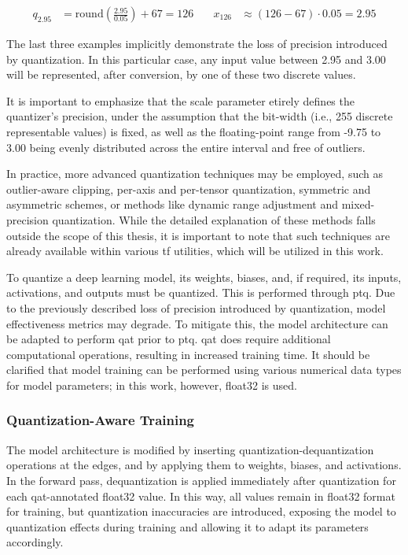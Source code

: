 {\begin{align*}
q_{2.95} &= \text{round}\left(\frac{2.95}{0.05} \right) + 67 = 126
& \quad
x_{126} &\approx \left( 126 - 67 \right) \cdot 0.05 = 2.95
\end{align*}

The last three examples implicitly demonstrate the loss of precision introduced by quantization.
In this particular case, any input value between 2.95 and 3.00 will be represented, after conversion, by one of these two discrete values.

It is important to emphasize that the scale parameter etirely defines the quantizer's precision,
under the assumption that the bit-width (i.e., 255 discrete representable values) is fixed,
as well as the floating-point range from -9.75 to 3.00 being evenly distributed across the entire interval and free of outliers.

In practice, more advanced quantization techniques may be employed, such as outlier-aware clipping, per-axis and per-tensor quantization,
symmetric and asymmetric schemes, or methods like dynamic range adjustment and mixed-precision quantization.
While the detailed explanation of these methods falls outside the scope of this thesis,
it is important to note that such techniques are already available within various \gls{tf} utilities, which will be utilized in this work.

To quantize a deep learning model, its weights, biases, and, if required, its inputs, activations, and outputs must be quantized. This is performed through \gls{ptq}.
Due to the previously described loss of precision introduced by quantization, model effectiveness metrics may degrade.
To mitigate this, the model architecture can be adapted to perform \gls{qat} prior to \gls{ptq}.
\gls{qat} does require additional computational operations, resulting in increased training time.
It should be clarified that model training can be performed using various numerical data types for model parameters; in this work, however, \gls{float32} is used.

\subsubsection{Quantization-Aware Training}
\label{subsubsec:qat}

The model architecture is modified by inserting quantization-dequantization operations at the edges, and by applying them to weights, biases, and activations.
In the forward pass, dequantization is applied immediately after quantization for each \gls{qat}-annotated \gls{float32} value.
In this way, all values remain in \gls{float32} format for training,
but quantization inaccuracies are introduced, exposing the model to quantization effects during training and allowing it to adapt its parameters accordingly.

}
